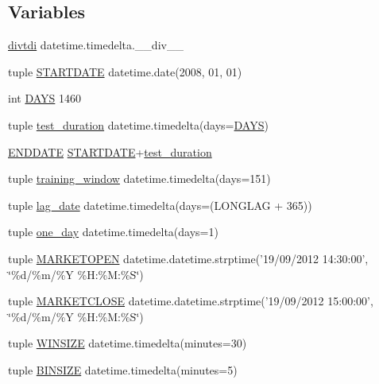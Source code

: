 \subsection*{Variables}
\begin{DoxyCompactItemize}
\item 
\hyperlink{namespacedates_a0a75bf3ce0cc8409fe6cca4a3bb439e6}{divtdi} datetime.\-timedelta.\-\_\-\-\_\-div\-\_\-\-\_\-
\item 
tuple \hyperlink{namespacedates_ac6489b4c92e3ce7332c95047607c9802}{S\-T\-A\-R\-T\-D\-A\-T\-E} datetime.\-date(2008, 01, 01)
\item 
int \hyperlink{namespacedates_a0bb42c665f258bad88c203d83beffc2d}{D\-A\-Y\-S} 1460
\item 
tuple \hyperlink{namespacedates_a8f45c9d96755d9c6b639551cb617a110}{test\-\_\-duration} datetime.\-timedelta(days=\hyperlink{namespacedates_a0bb42c665f258bad88c203d83beffc2d}{D\-A\-Y\-S})
\item 
\hyperlink{namespacedates_aee682e27a5cb1e7fae89ee59079f8c46}{E\-N\-D\-D\-A\-T\-E} \hyperlink{namespacedates_ac6489b4c92e3ce7332c95047607c9802}{S\-T\-A\-R\-T\-D\-A\-T\-E}+\hyperlink{namespacedates_a8f45c9d96755d9c6b639551cb617a110}{test\-\_\-duration}
\item 
tuple \hyperlink{namespacedates_a81399f28153bf5b8b5dbed39dc4c8781}{training\-\_\-window} datetime.\-timedelta(days=151)
\item 
tuple \hyperlink{namespacedates_aa7d9556c2429b0dd8c5c3903ec21a708}{lag\-\_\-date} datetime.\-timedelta(days=(L\-O\-N\-G\-L\-A\-G + 365))
\item 
tuple \hyperlink{namespacedates_a8d9eade5fcb0146fcd3e5321e21bf680}{one\-\_\-day} datetime.\-timedelta(days=1)
\item 
tuple \hyperlink{namespacedates_a655924a1ad262dcc91ce43132ef0ae58}{M\-A\-R\-K\-E\-T\-O\-P\-E\-N} datetime.\-datetime.\-strptime('19/09/2012 14\-:30\-:00', \char`\"{}\%d/\%m/\%Y \%H\-:\%M\-:\%S\char`\"{})
\item 
tuple \hyperlink{namespacedates_a8f24102a16c642a20c044ebe835f8957}{M\-A\-R\-K\-E\-T\-C\-L\-O\-S\-E} datetime.\-datetime.\-strptime('19/09/2012 15\-:00\-:00', \char`\"{}\%d/\%m/\%Y \%H\-:\%M\-:\%S\char`\"{})
\item 
tuple \hyperlink{namespacedates_ad8b2a27a0eefcdf0c7c50ad7aebeb42b}{W\-I\-N\-S\-I\-Z\-E} datetime.\-timedelta(minutes=30)
\item 
tuple \hyperlink{namespacedates_a67b3a3a8f382e17df58f50fef4a7fb6d}{B\-I\-N\-S\-I\-Z\-E} datetime.\-timedelta(minutes=5)
\end{DoxyCompactItemize}


